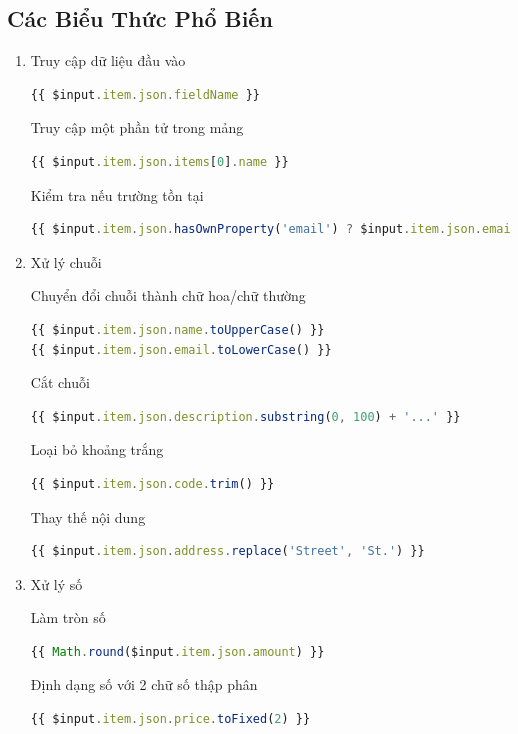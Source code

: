 \subsection{Các Biểu Thức Phổ Biến}
\begin{enumerate}
    \item Truy cập dữ liệu đầu vào
\begin{lstlisting}[language = Javascript]   
{{ $input.item.json.fieldName }}
\end{lstlisting}

 Truy cập một phần tử trong mảng
\begin{lstlisting}[language = Javascript]
{{ $input.item.json.items[0].name }}
\end{lstlisting}
Kiểm tra nếu trường tồn tại
\begin{lstlisting}[language = Javascript]
{{ $input.item.json.hasOwnProperty('email') ? $input.item.json.email : 'unknown' }}
\end{lstlisting}
\item Xử lý chuỗi

Chuyển đổi chuỗi thành chữ hoa/chữ thường
\begin{lstlisting}[language = Javascript]
{{ $input.item.json.name.toUpperCase() }}
{{ $input.item.json.email.toLowerCase() }}
\end{lstlisting}

Cắt chuỗi
\begin{lstlisting}[language = Javascript]
{{ $input.item.json.description.substring(0, 100) + '...' }}
\end{lstlisting}

Loại bỏ khoảng trắng
\begin{lstlisting}[language = Javascript]
{{ $input.item.json.code.trim() }}
\end{lstlisting}

Thay thế nội dung
\begin{lstlisting}[language = Javascript]
{{ $input.item.json.address.replace('Street', 'St.') }}
\end{lstlisting}
\item Xử lý số

Làm tròn số
\begin{lstlisting}[language = Javascript]
{{ Math.round($input.item.json.amount) }}
\end{lstlisting}

 Định dạng số với 2 chữ số thập phân
\begin{lstlisting}[language = Javascript]
{{ $input.item.json.price.toFixed(2) }}
\end{lstlisting}


\end{enumerate}
